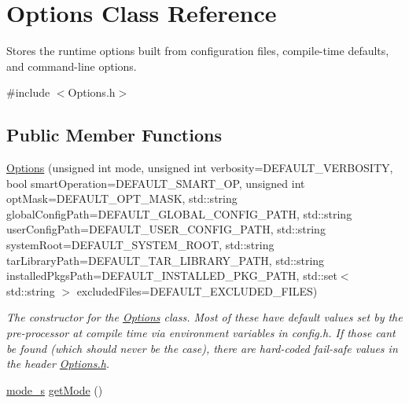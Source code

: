 \hypertarget{classOptions}{}\section{Options Class Reference}
\label{classOptions}


Stores the runtime options built from configuration files, compile-\/time defaults, and command-\/line options.  




{\ttfamily \#include $<$Options.\+h$>$}

\subsection*{Public Member Functions}
\begin{DoxyCompactItemize}
\item 
\mbox{\hyperlink{classOptions_a24cba1d09080384c9939db6682ea57ec}{Options}} (unsigned int mode, unsigned int verbosity=D\+E\+F\+A\+U\+L\+T\+\_\+\+V\+E\+R\+B\+O\+S\+I\+TY, bool smart\+Operation=D\+E\+F\+A\+U\+L\+T\+\_\+\+S\+M\+A\+R\+T\+\_\+\+OP, unsigned int opt\+Mask=D\+E\+F\+A\+U\+L\+T\+\_\+\+O\+P\+T\+\_\+\+M\+A\+SK, std\+::string global\+Config\+Path=D\+E\+F\+A\+U\+L\+T\+\_\+\+G\+L\+O\+B\+A\+L\+\_\+\+C\+O\+N\+F\+I\+G\+\_\+\+P\+A\+TH, std\+::string user\+Config\+Path=D\+E\+F\+A\+U\+L\+T\+\_\+\+U\+S\+E\+R\+\_\+\+C\+O\+N\+F\+I\+G\+\_\+\+P\+A\+TH, std\+::string system\+Root=D\+E\+F\+A\+U\+L\+T\+\_\+\+S\+Y\+S\+T\+E\+M\+\_\+\+R\+O\+OT, std\+::string tar\+Library\+Path=D\+E\+F\+A\+U\+L\+T\+\_\+\+T\+A\+R\+\_\+\+L\+I\+B\+R\+A\+R\+Y\+\_\+\+P\+A\+TH, std\+::string installed\+Pkgs\+Path=D\+E\+F\+A\+U\+L\+T\+\_\+\+I\+N\+S\+T\+A\+L\+L\+E\+D\+\_\+\+P\+K\+G\+\_\+\+P\+A\+TH, std\+::set$<$ std\+::string $>$ excluded\+Files=D\+E\+F\+A\+U\+L\+T\+\_\+\+E\+X\+C\+L\+U\+D\+E\+D\+\_\+\+F\+I\+L\+ES)
\begin{DoxyCompactList}\small\item\em The constructor for the \mbox{\hyperlink{classOptions}{Options}} class. Most of these have default values set by the pre-\/processor at compile time via environment variables in config.\+h. If those can\textquotesingle{}t be found (which should never be the case), there are hard-\/coded fail-\/safe values in the header \mbox{\hyperlink{Options_8h}{Options.\+h}}. \end{DoxyCompactList}\item 
\mbox{\hyperlink{structmode__s}{mode\+\_\+s}} \mbox{\hyperlink{classOptions_a4faeff2138155356b947d9218bbcb558}{get\+Mode}} ()

\end{DoxyCompactItemize}
